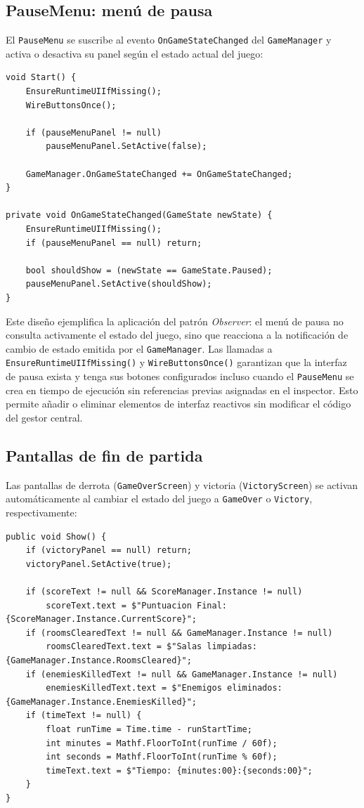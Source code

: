 \subsection{PauseMenu: menú de pausa}


El \texttt{PauseMenu} se suscribe al evento \texttt{OnGameStateChanged} del \texttt{GameManager} y activa o desactiva su panel según el estado actual del juego:

\begin{lstlisting}
void Start() {
    EnsureRuntimeUIIfMissing();
    WireButtonsOnce();
    
    if (pauseMenuPanel != null)
        pauseMenuPanel.SetActive(false);
    
    GameManager.OnGameStateChanged += OnGameStateChanged;
}

private void OnGameStateChanged(GameState newState) {
    EnsureRuntimeUIIfMissing();
    if (pauseMenuPanel == null) return;
    
    bool shouldShow = (newState == GameState.Paused);
    pauseMenuPanel.SetActive(shouldShow);
}
\end{lstlisting}


Este diseño ejemplifica la aplicación del patrón \textit{Observer}: el menú de pausa no consulta activamente el estado del juego, sino que reacciona a la notificación de cambio de estado emitida por el \texttt{GameManager}. Las llamadas a \texttt{EnsureRuntimeUIIfMissing()} y \texttt{WireButtonsOnce()} garantizan que la interfaz de pausa exista y tenga sus botones configurados incluso cuando el \texttt{PauseMenu} se crea en tiempo de ejecución sin referencias previas asignadas en el inspector. Esto permite añadir o eliminar elementos de interfaz reactivos sin modificar el código del gestor central.

\subsection{Pantallas de fin de partida}


Las pantallas de derrota (\texttt{GameOverScreen}) y victoria (\texttt{VictoryScreen}) se activan automáticamente al cambiar el estado del juego a \texttt{GameOver} o \texttt{Victory}, respectivamente:

\begin{lstlisting}
public void Show() {
    if (victoryPanel == null) return;
    victoryPanel.SetActive(true);
    
    if (scoreText != null && ScoreManager.Instance != null)
        scoreText.text = $"Puntuacion Final: {ScoreManager.Instance.CurrentScore}";
    if (roomsClearedText != null && GameManager.Instance != null)
        roomsClearedText.text = $"Salas limpiadas: {GameManager.Instance.RoomsCleared}";
    if (enemiesKilledText != null && GameManager.Instance != null)
        enemiesKilledText.text = $"Enemigos eliminados: {GameManager.Instance.EnemiesKilled}";
    if (timeText != null) {
        float runTime = Time.time - runStartTime;
        int minutes = Mathf.FloorToInt(runTime / 60f);
        int seconds = Mathf.FloorToInt(runTime % 60f);
        timeText.text = $"Tiempo: {minutes:00}:{seconds:00}";
    }
}
\end{lstlisting}



